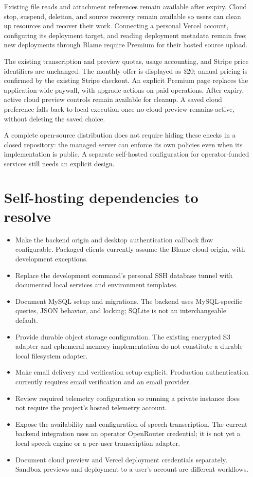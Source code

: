 \documentclass[11pt,a4paper]{article}
\begin{document}
Existing file reads and attachment references remain available after expiry.
Cloud stop, suspend, deletion, and source recovery remain available so users can
clean up resources and recover their work. Connecting a personal Vercel account,
configuring its deployment target, and reading deployment metadata remain free;
new deployments through Blame require Premium for their hosted source upload.

The existing transcription and preview quotas, usage accounting, and Stripe
price identifiers are unchanged. The monthly offer is displayed as \$20;
annual pricing is confirmed by the existing Stripe checkout. An explicit
Premium page replaces the application-wide paywall, with upgrade actions on
paid operations. After expiry, active cloud preview controls remain available
for cleanup. A saved cloud preference falls back to local execution once no
cloud preview remains active, without deleting the saved choice.

A complete open-source distribution does not require hiding these checks in a
closed repository: the managed server can enforce its own policies even when
its implementation is public. A separate self-hosted configuration for
operator-funded services still needs an explicit design.

\section{Self-hosting dependencies to resolve}
\begin{itemize}
\item Make the backend origin and desktop authentication callback flow
configurable. Packaged clients currently assume the Blame cloud origin, with
development exceptions.
\item Replace the development command's personal SSH database tunnel with
documented local services and environment templates.
\item Document MySQL setup and migrations. The backend uses MySQL-specific
queries, JSON behavior, and locking; SQLite is not an interchangeable default.
\item Provide durable object storage configuration. The existing encrypted S3
adapter and ephemeral memory implementation do not constitute a durable local
filesystem adapter.
\item Make email delivery and verification setup explicit. Production
authentication currently requires email verification and an email provider.
\item Review required telemetry configuration so running a private instance
does not require the project's hosted telemetry account.
\item Expose the availability and configuration of speech transcription. The
current backend integration uses an operator OpenRouter credential; it is not
yet a local speech engine or a per-user transcription adapter.
\item Document cloud preview and Vercel deployment credentials separately.
Sandbox previews and deployment to a user's account are different workflows.
\end{itemize}
\end{document}
